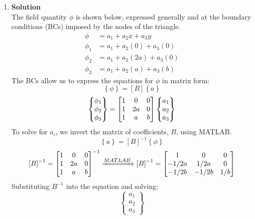 \documentclass[12pt,letterpaper]{article}
\begin{document}
\begin{enumerate}[label=(\alph*)]
\begin{enumerate}[label=\arabic*.]
			\item{\textbf{Solution}} \\
			The field quantity $\phi$ is shown below, expressed generally and at the boundary conditions (BCs) imposed by the nodes of the triangle.
			\begin{align*}
				\phi &= a_1 + a_2x + a_3y\\
				\phi_1 &= a_1 + a_2(0) + a_3(0)\\
				\phi_2 &= a_1 + a_2(2a) + a_3(0)\\
				\phi_3 &= a_1 + a_2(a) + a_3(b)		
			\end{align*}
			The BCs allow us to express the equations for $\phi$ in matrix form:
			\begin{equation*}
				\left\{\phi\right\} = \left[B\right]\left\{a\right\}
			\end{equation*}
			\begin{equation*}
				\begin{Bmatrix}
					\phi_1 \\ \phi_2 \\ \phi_3
				\end{Bmatrix}
				= \mqty[1 & 0 & 0 \\ 1 & 2a & 0 \\ 1 & a & b]
				\begin{Bmatrix}
					a_1 \\ a_2 \\ a_3
				\end{Bmatrix}
			\end{equation*}
			To solve for $a_i$, we invert the matrix of coefficients, $B$, using MATLAB.
			\begin{equation*}
				\left\{a\right\} = \left[B\right]^{-1}\left\{\phi\right\}
			\end{equation*}
			\begin{equation*}
				\left[B\right]^{-1} =  \mqty[1 & 0 & 0 \\ 1 & 2a & 0 \\ 1 & a & b]^{-1} \xRightarrow{MATLAB} \left[B\right]^{-1} = \mqty[1 & 0 & 0 \\ -1/2a & 1/2a & 0 \\ -1/2b & -1/2b & 1/b]
			\end{equation*}
			Substituting $B^{-1}$ into the equation and solving:
			\begin{equation*}
				\begin{Bmatrix}
					a_1 \\ a_2 \\ a_3
				\end{Bmatrix}

\end{equation*}
\end{enumerate}
\end{enumerate}
\end{document}
